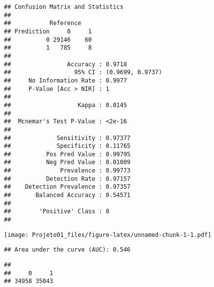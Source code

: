 \documentclass[]{article}
\newenvironment{Shaded}{\begin{snugshade}}{\end{snugshade}}
\newcommand{\CommentTok}[1]{\textcolor[rgb]{0.56,0.35,0.01}{\textit{#1}}}
\newcommand{\DataTypeTok}[1]{\textcolor[rgb]{0.13,0.29,0.53}{#1}}
\newcommand{\KeywordTok}[1]{\textcolor[rgb]{0.13,0.29,0.53}{\textbf{#1}}}
\newcommand{\NormalTok}[1]{#1}
\newcommand{\OperatorTok}[1]{\textcolor[rgb]{0.81,0.36,0.00}{\textbf{#1}}}
\newcommand{\StringTok}[1]{\textcolor[rgb]{0.31,0.60,0.02}{#1}}
\begin{document}
\begin{verbatim}
## Confusion Matrix and Statistics
## 
##           Reference
## Prediction     0     1
##          0 29146    60
##          1   785     8
##                                           
##                Accuracy : 0.9718          
##                  95% CI : (0.9699, 0.9737)
##     No Information Rate : 0.9977          
##     P-Value [Acc > NIR] : 1               
##                                           
##                   Kappa : 0.0145          
##                                           
##  Mcnemar's Test P-Value : <2e-16          
##                                           
##             Sensitivity : 0.97377         
##             Specificity : 0.11765         
##          Pos Pred Value : 0.99795         
##          Neg Pred Value : 0.01009         
##              Prevalence : 0.99773         
##          Detection Rate : 0.97157         
##    Detection Prevalence : 0.97357         
##       Balanced Accuracy : 0.54571         
##                                           
##        'Positive' Class : 0               
## 
\end{verbatim}

\begin{Shaded}
\end{Shaded}

\texttt{[image: Projeto01\_files/figure-latex/unnamed-chunk-1-1.pdf]}

\begin{verbatim}
## Area under the curve (AUC): 0.546
\end{verbatim}

\begin{Shaded}
\end{Shaded}

\begin{verbatim}
## 
##     0     1 
## 34958 35043
\end{verbatim}
\end{document}
